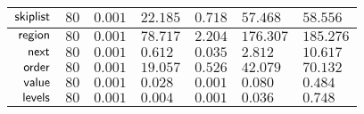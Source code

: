 {\begin{tabular}{|r||T||W|W|W||W|W||}
		$\mathsf{skiplist}$			&  $80$ & $0.001$ & $22.185$ & $0.718$ & $57.468$ & $58.556$ \\ \hline
		$\mathsf{region}$			&  $80$ & $0.001$ & $78.717$ & $2.204$ &$176.307$ &$185.276$ \\ \hline
		$\mathsf{next}$				&  $80$ & $0.001$ &  $0.612$ & $0.035$ &  $2.812$ & $10.617$ \\ \hline
		$\mathsf{order}$				&  $80$ & $0.001$ & $19.057$ & $0.526$ & $42.079$ & $70.132$ \\ \hline
		$\mathsf{value}$				&  $80$ & $0.001$ &  $0.028$ & $0.001$ &  $0.080$ &  $0.484$ \\ \hline
		$\mathsf{levels}$			&  $80$ & $0.001$ &  $0.004$ & $0.001$ &  $0.036$ &  $0.748$ \\ \hline
	\end{tabular}
}
